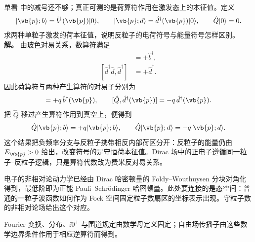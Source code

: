 \begin{exbox}[粒子与反粒子的 $U(1)$ 荷]
单看 中的减号还不够；真正可测的是荷算符作用在激发态上的本征值。定义
\begin{equation*}
 |\vb{p};b\rangle
 =\hat b^\dagger(\vb{p})|0\rangle,
 \qquad
 |\vb{p};d\rangle
 =\hat d^\dagger(\vb{p})|0\rangle,
 \qquad \hat Q|0\rangle=0.
\end{equation*}
求两种单粒子激发的荷本征值，说明反粒子的电荷符号与能量符号怎样区别。
\textbf{解。} 由玻色对易关系，数算符满足
\begin{align*}
 [\hat b^\dagger\hat b,\hat b^\dagger]&=+\hat b^\dagger,\\
 [\hat d^\dagger\hat d,\hat d^\dagger]&=+\hat d^\dagger.
\end{align*}
因此荷算符与两种产生算符的对易子分别为
\begin{equation*}
 [\hat Q,\hat b^\dagger(\vb{p})]
 =+q\,\hat b^\dagger(\vb{p}),
 \qquad
 [\hat Q,\hat d^\dagger(\vb{p})]
 =-q\,\hat d^\dagger(\vb{p}).
\end{equation*}
把 $\hat Q$ 移过产生算符作用到真空上，便得到
\begin{equation*}
 \hat Q|\vb{p};b\rangle=+q|\vb{p};b\rangle,
 \qquad
 \hat Q|\vb{p};d\rangle=-q|\vb{p};d\rangle.
\end{equation*}
这个结果把负频率分支与反粒子携带相反内部荷区分开：反粒子的能量仍由 $E_{\vb{p}}>0$ 给出，改变符号的是守恒荷本征值。Dirac 场中的正电子遵循同一粒子--反粒子逻辑，只是算符代数改为费米反对易关系。
\end{exbox}



电子的非相对论动力学已经由 Dirac 哈密顿量的 Foldy--Wouthuysen 分块对角化得到，最低阶即为正能 Pauli--Schr\"odinger 哈密顿量。此处要连接的是态空间：普通的一粒子波函数如何作为 Fock 空间固定粒子数扇区的坐标表示出现。守粒子数的非相对论场给出这个对应。


Fourier 变换、分布、$\ii0^+$ 与围道规定由数学母定义固定；自由场传播子由这些数学边界条件作用于相应逆算符而得到。

